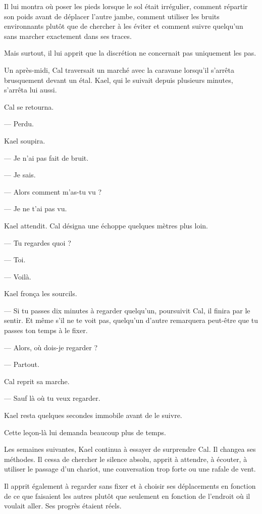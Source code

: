 Il lui montra où poser les pieds lorsque le sol était irrégulier, comment
répartir son poids avant de déplacer l'autre jambe, comment utiliser les bruits
environnants plutôt que de chercher à les éviter et comment suivre quelqu'un
sans marcher exactement dans ses traces.

Mais surtout, il lui apprit que la discrétion ne concernait pas uniquement les
pas.

Un après-midi, Cal traversait un marché avec la caravane lorsqu'il s'arrêta
brusquement devant un étal. Kael, qui le suivait depuis plusieurs minutes,
s'arrêta lui aussi.

Cal se retourna.

— Perdu.

Kael soupira.

— Je n'ai pas fait de bruit.

— Je sais.

— Alors comment m'as-tu vu ?

— Je ne t'ai pas vu.

Kael attendit. Cal désigna une échoppe quelques mètres plus loin.

— Tu regardes quoi ?

— Toi.

— Voilà.

Kael fronça les sourcils.

— Si tu passes dix minutes à regarder quelqu'un, poursuivit Cal, il finira par
le sentir. Et même s'il ne te voit pas, quelqu'un d'autre remarquera peut-être
que tu passes ton temps à le fixer.

— Alors, où dois-je regarder ?

— Partout.

Cal reprit sa marche.

— Sauf là où tu veux regarder.

Kael resta quelques secondes immobile avant de le suivre.

Cette leçon-là lui demanda beaucoup plus de temps.

\scenebreak

Les semaines suivantes, Kael continua à essayer de surprendre Cal. Il changea
ses méthodes. Il cessa de chercher le silence absolu, apprit à attendre, à
écouter, à utiliser le passage d'un chariot, une conversation trop forte ou une
rafale de vent.

Il apprit également à regarder sans fixer et à choisir ses déplacements en
fonction de ce que faisaient les autres plutôt que seulement en fonction de
l'endroit où il voulait aller. Ses progrès étaient réels.


